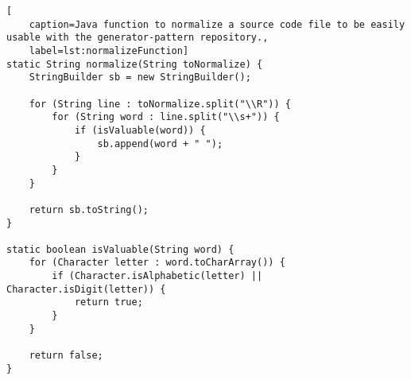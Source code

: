 
\begin{lstlisting}[
	caption=Java function to normalize a source code file to be easily usable with the generator-pattern repository.,
	label=lst:normalizeFunction]
static String normalize(String toNormalize) {
	StringBuilder sb = new StringBuilder();

	for (String line : toNormalize.split("\\R")) {
		for (String word : line.split("\\s+")) {
			if (isValuable(word)) {
				sb.append(word + " ");
			}
		}
	}

	return sb.toString();
}	

static boolean isValuable(String word) {
	for (Character letter : word.toCharArray()) {
		if (Character.isAlphabetic(letter) || Character.isDigit(letter)) {
			return true;
		}
	}
	
	return false;
}
	
\end{lstlisting}